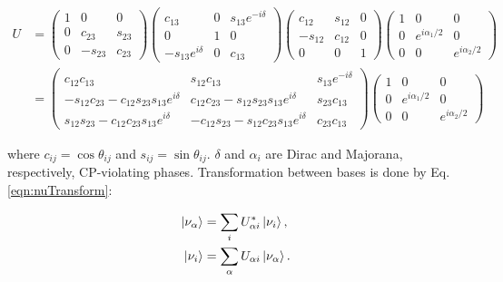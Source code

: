 \begin{equation}
\begin{aligned}
U &= \begin{pmatrix}
1 & 0 & 0 \\
0 & c_{23} & s_{23} \\
0 & -s_{23} & c_{23} \end{pmatrix}
\begin{pmatrix}
c_{13} & 0 & s_{13} e^{-i \delta} \\
0 & 1 & 0 \\
-s_{13} e^{i \delta} & 0 & c_{13} \end{pmatrix}
\begin{pmatrix}
c_{12} & s_{12} & 0 \\
-s_{12} & c_{12} & 0 \\
0 & 0 & 1 \end{pmatrix}
\begin{pmatrix}
1 & 0 & 0 \\
0 & e^{i \alpha_{1}/2} & 0 \\
0 & 0 & e^{i \alpha_{2}/2} \end{pmatrix} \\
& = \begin{pmatrix}
c_{12} c_{13} & s_{12} c_{13} & s_{13} e^{-i \delta} \\
-s_{12} c_{23} - c_{12} s_{23} s_{13} e^{i \delta} & c_{12} c_{23} - s_{12} s_{23} s_{13} e^{i \delta} & s_{23} c_{13} \\
s_{12} s_{23} - c_{12} c_{23} s_{13} e^{i \delta} & -c_{12} s_{23} - s_{12} c_{23} s_{13} e^{i \delta} & c_{23} c_{13} \end{pmatrix}
\begin{pmatrix}
1 & 0 & 0 \\
0 & e^{i \alpha_{1}/2} & 0 \\
0 & 0 & e^{i \alpha_{2}/2} \end{pmatrix}
\end{aligned}
\label{eqn:umatrix}
\end{equation}

\noindent
where $c_{ij} = \cos \theta_{ij}$ and $s_{ij} = \sin \theta_{ij}$.  $\delta$  and $\alpha_{i}$ are Dirac and Majorana, respectively, CP-violating phases.  Transformation between bases is done by Eq. \ref{eqn:nuTransform}:

\begin{equation}
\begin{aligned}
\ket{\nu_{\alpha}} &= \sum\limits_{i} U^{*}_{\alpha i} \ket{\nu_{i}},\\
\ket{\nu_{i}} &= \sum\limits_{\alpha} U_{\alpha i} \ket{\nu_{\alpha}}.
\end{aligned}
\label{eqn:nuTransform}
\end{equation}

